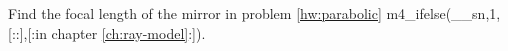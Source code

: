 Find the focal length of the mirror in problem \ref{hw:parabolic} 
m4_ifelse(__sn,1,[::],[:in chapter \ref{ch:ray-model}:]).\answercheck
